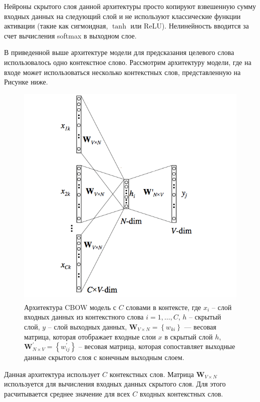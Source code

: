 \documentclass[12pt,a4paper, oneside]{extreport}
\begin{document}
Нейроны скрытого слоя данной архитектуры просто копируют взвешенную сумму входных данных на следующий слой и не используют классические функции активации (такие как сигмоидная, $\tanh$ или ReLU). Нелинейность вводится за счет вычисления softmax в выходном слое.

В приведенной выше архитектуре модели для предсказания целевого слова использовалось одно контекстное слово. 
Рассмотрим архитектуру модели, где на входе может использоваться  несколько контекстных слов, представленную на Рисунке ниже.

\begin{figure}[H]
	\centering
	\includegraphics[width=0.7\linewidth]{screenshot003}
	\caption{Архитектура CBOW модель с  $C$ словами в контексте, где
			\newline		 $x_{i} $ -- слой входных данных из контекстного слова $i=1,\dots,C$, 
			\newline		 $h $ -- скрытый слой,
			\newline		 $y
$ --  слой выходных данных, 
			\newline
			$\mathbf{W}_{V \times N}=\left\{w_{k i}\right\}$ — весовая матрица, которая отображает входные слои $x$ в скрытый слой $h$,
			\newline
			$\mathbf{W}_{N \times V}^{\prime}=\left\{w_{i j}^{\prime}\right\}$ -- 
			весовая матрица, которая сопоставляет выходные данные скрытого слоя с конечным выходным слоем.}

	\label{fig:screenshot003}
\end{figure}



Данная архитектура использует $C$  контекстных  слов. Матрица $\mathbf{W}_{V \times N}$  используется для вычисления входных данных скрытого слоя. Для этого расчитывается среднее значение для всех $C$ входных контекстных  слов. 
\end{document}
